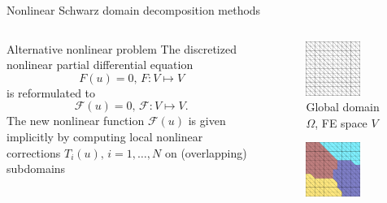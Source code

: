 \begin{frame}[noframenumbering]{Nonlinear Schwarz domain decomposition methods}%
	\vspace{-5mm}
	\begin{columns}
		\begin{column}{0.7\textwidth}
      \centering
			\begin{block}{\normalsize Alternative nonlinear problem}
				The discretized nonlinear partial differential equation
				\begin{equation*}
					F(u) = 0,\, F : V\mapsto V
				\end{equation*}
				is reformulated to
				\begin{equation*}
          \mathcal{F}(u) = 0,\, \mathcal{F} : V\mapsto V.
				\end{equation*}
				The new nonlinear function $\mathcal{F}(u)$ is given implicitly by computing local nonlinear corrections $T_i(u),\,i = 1,\dots,N$ on (overlapping) subdomains
			\end{block}
		\end{column}
		\begin{column}{0.3\textwidth}
			\begin{figure}
				\includegraphics[height=0.4\textwidth,width=0.7\textwidth]{images/DD-mesh-1.png}
				\vspace{-2mm}
				\caption{\tiny Global domain $\Omega$, FE space $V$}
			\end{figure}
			\vspace{-6mm}
			\begin{figure}
				\includegraphics[height=0.4\textwidth,width=0.7\textwidth]{images/DD-mesh-2.png}

\end{figure}
\end{column}
\end{columns}
\end{frame}
